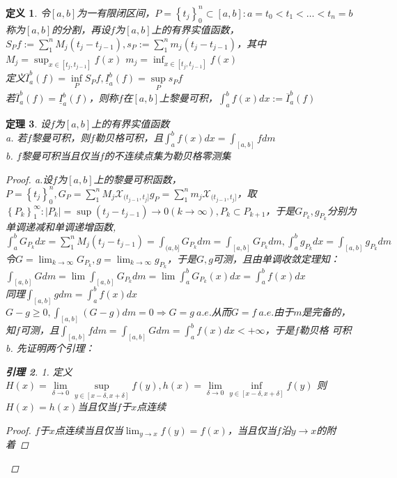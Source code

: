 \documentclass[12pt, a4paper, oneside]{ctexbook}
\newtheorem{theorem}{定理}[section]
\newtheorem{definition}[theorem]{定义}
\newtheorem{lemma}[theorem]{引理}
\begin{document}
\begin{definition}
    令$[a,b]$为一有限闭区间，$P=\left\{t_j\right\}_0^n\subset [a,b]:a=t_0<t_1<
    \dots<t_n=b$称为$[a,b]$的分割，再设$f$为$[a,b]$上的有界实值函数，\\
    $S_P f:=\sum_1^nM_j(t_j-t_{j-1}),s_P:=\sum_1^nm_j(t_j-t_{j-1})$，其中$M_j=\sup_{x\in[t_j,t_{j-1}]}f(x)$
    $m_j=\inf_{x\in[t_j,t_{j-1}]}f(x)$\\
    定义$\overline{I}_a^b(f)=\underset{P}{\inf}S_Pf,\underline{I}_a^b(f)=\underset{P}{\sup}s_Pf$\\
    若$\overline{I}_a^b(f)=\underline{I}_a^b(f)$，则称$f$在$[a,b]$上黎曼可积，$\int_a^bf(x)dx:=\overline{I}_a^b(f)$
\end{definition}
\begin{theorem}
    设$f$为$[a,b]$上的有界实值函数\\
    a. 若$f$黎曼可积，则$f$勒贝格可积，且$\int_a^bf(x)dx=\int_{[a,b]}fdm$\\
    b. $f$黎曼可积当且仅当$f$的不连续点集为勒贝格零测集
    \begin{proof}
        a.设$f$为$[a,b]$上的黎曼可积函数，$P=\left\{t_j\right\}_0^n,G_P=\sum_1^nM_j\mathcal{X}_{(t_{j-1},t_j]}
        g_P=\sum_1^nm_j\mathcal{X}_{(t_{j-1},t_j]}$，取$\left\{P_k\right\}_1^{\infty}:|P_k|=\sup(t_j-t_{j-1})\to 0(k\to\infty),P_k\subset 
        P_{k+1}$，于是$G_{P_k},g_{P_k}$分别为单调递减和单调递增函数,$\int_a^bG_{P_k}dx=\sum_1^nM_j(t_j-t_{j-1})=
        \int_{(a,b]}G_{P_k}dm=\int_{[a,b]}G_{P_k}dm,\int_a^bg_{P_k}dx=\int_{[a,b]}g_{P_k}dm$\\
        令$G=\lim_{k\to\infty}G_{P_k},g=\lim_{k\to\infty}g_{P_k}$，于是$G,g$可测，且由单调收敛定理知：
        $\int_{[a,b]}Gdm=\lim\int_{[a,b]}G_{P_k}dm=\lim\int_a^bG_{P_k}(x)dx=\int_a^bf(x)dx$\\
        同理$\int_{[a,b]}gdm=\int_a^bf(x)dx$\\
        $G-g\geq 0,\int_{[a,b]}(G-g)dm=0\Rightarrow G=g\ a.e.$从而$G=f\ a.e.$由于$m$是完备的，
        知$f$可测，且$\int_{[a,b]}fdm=\int_{[a,b]}Gdm=\int_a^bf(x)dx<+\infty$，于是$f$勒贝格
        可积\\
        b. 先证明两个引理：
        \begin{lemma}{1.}
            定义$H(x)=\underset{\delta\to 0}{\lim}\underset{y\in[x-\delta,x+\delta]}{\sup}f(y),h(x)=\underset{\delta\to 0}{\lim}\underset{y\in[x-\delta,x+\delta]}{\inf}f(y)$
            则$H(x)=h(x)$当且仅当$f$于$x$点连续
            \begin{proof}
                $f$于$x$点连续当且仅当$\lim_{y\to x}f(y)=f(x)$，当且仅当$f$沿$y\to x$的附着

\end{proof}
\end{lemma}
\end{proof}
\end{theorem}
\end{document}
